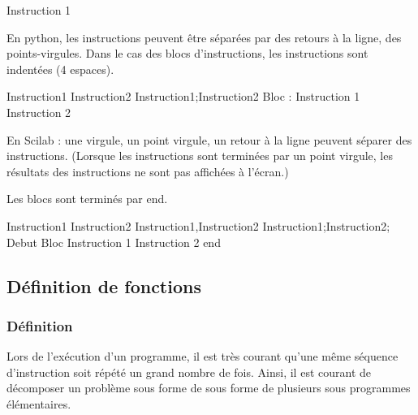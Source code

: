 \documentclass[11pt,oneside]{article}
\begin{document}
\begin{exemple}

\begin{pseudo}
\begin{algorithm}[H]
Instruction 1
\end{algorithm}
\end{pseudo}
En python, les instructions peuvent être séparées par des retours à la ligne, des points-virgules. Dans le cas des blocs d'instructions, les instructions sont indentées (4 espaces). 
\begin{py}
\begin{minipage}{.9\linewidth}
\begin{python}[showspaces=true]
Instruction1
Instruction2
Instruction1;Instruction2
Bloc : 
    Instruction 1
    Instruction 2
\end{python}
\end{minipage}
\end{py}
En Scilab : une virgule, un point virgule, un retour à la ligne peuvent séparer des instructions. (Lorsque les instructions sont terminées par un point virgule, les résultats des instructions ne sont pas affichées à l'écran.)

Les blocs sont terminés par \textsf{end}.
\begin{sci}
\begin{scilab}
Instruction1
Instruction2
Instruction1,Instruction2
Instruction1;Instruction2;
Debut Bloc
Instruction 1
Instruction 2
end
\end{scilab}
\end{sci}
\end{exemple}


\subsection{Définition de fonctions}
\subsubsection{Définition}
Lors de l'exécution d'un programme, il est très courant qu'une même séquence d'instruction soit répété un grand nombre de fois. Ainsi, il est courant de décomposer un problème sous forme de sous forme de plusieurs sous programmes élémentaires. 
\end{document}
